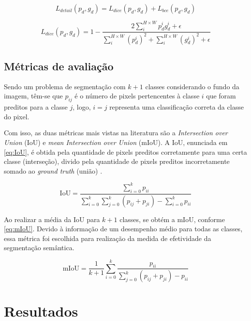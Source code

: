\documentclass[conference]{IEEEtran}
\begin{document}
\begin{equation} \label{eq:ldetail}
	L_{detail}(p_d,g_d) = L_{dice}(p_d, g_d) + L_{bce}(p_d, g_d)
\end{equation}

\begin{equation} \label{eq:ldice}
	L_{dice}(p_d, g_d) = 1 - \frac{2\sum_{i}^{H\times W}p_d^ig_d^i + \epsilon}{\sum_{i}^{H\times W}(p_d^i)^2 + \sum_{i}^{H\times W}(g_d^i)^2 + \epsilon}
\end{equation}


\subsection{Métricas de avaliação}

Sendo um problema de segmentação com $k +1$ classes considerando o fundo da imagem, têm-se que $p_{ij}$ é o número de pixels pertencentes à classe $i$ que foram preditos para a classe $j$, logo, $i = j$ representa uma classificação correta da classe do pixel.

Com isso, as duas métricas mais vistas na literatura são a \textit{Intersection over Union} (IoU) e \textit{mean Intersection over Union} (mIoU). A IoU, enunciada em \eqref{eq:IoU}, é obtida pela quantidade de pixels preditos corretamente para uma certa classe (interseção), divido pela quantidade de pixels preditos incorretamente somado ao \textit{ground truth} (união) \cite{papadeas2021RealTimeSemanticImage}. 

\begin{equation}\label{eq:IoU}
	\text{IoU} = \frac{\sum_{i=0}^{k}p_{ii}}{\sum_{i=0}^{k}\sum_{j=0}^{k}\left(p_{ij} + p_{ji}\right) - \sum_{i=0}^{k}p_{ii}}
\end{equation}

Ao realizar a média da IoU para $k+1$ classes, se obtém a mIoU, conforme \eqref{eq:mIoU}. Devido à informação de um desempenho médio para todas as classes, essa métrica foi escolhida para realização da medida de efetividade da segmentação semântica.

\begin{equation}\label{eq:mIoU}
	\text{mIoU} = \frac{1}{k+1} \sum_{i = 0}^{k}\frac{p_{ii}}{\sum_{j=0}^{k}\left(p_{ij} + p_{ji}\right) - p_{ii}}
\end{equation}



\section{Resultados}  \label{sc:resultados}
\end{document}
